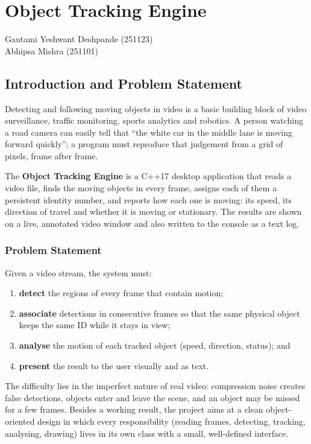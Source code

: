 \documentclass[12pt,a4paper,oneside]{book}
\makeatletter
\newcommand{\chapterauthor}[1]{%
  {\parindent0pt\vspace*{-15pt}%
  \linespread{1.1}\large\itshape\begin{flushright}#1\end{flushright}%
  \par\nobreak\vspace*{25pt}}
  \@afterheading%
}
\makeatother
\begin{document}
\pagestyle{plain}%
\mainmatter


\setcounter{chapter}{2}%
\chapter{Object Tracking Engine}
\chapterauthor{Gautami Yeshwant Deshpande (251123)\\Abhipsa Mishra (251101)}

\section{Introduction and Problem Statement}
Detecting and following moving objects in video is a basic building block of video surveillance, traffic monitoring, sports analytics and robotics. A person watching a road camera can easily tell that ``the white car in the middle lane is moving forward quickly''; a program must reproduce that judgement from a grid of pixels, frame after frame.

The \textbf{Object Tracking Engine} is a C++17 desktop application that reads a video file, finds the moving objects in every frame, assigns each of them a persistent identity number, and reports how each one is moving: its speed, its direction of travel and whether it is moving or stationary. The results are shown on a live, annotated video window and also written to the console as a text log.

\subsection{Problem Statement}
Given a video stream, the system must:
\begin{enumerate}
    \item \textbf{detect} the regions of every frame that contain motion;
    \item \textbf{associate} detections in consecutive frames so that the same physical object keeps the same ID while it stays in view;
    \item \textbf{analyse} the motion of each tracked object (speed, direction, status); and
    \item \textbf{present} the result to the user visually and as text.
\end{enumerate}
The difficulty lies in the imperfect nature of real video: compression noise creates false detections, objects enter and leave the scene, and an object may be missed for a few frames. Besides a working result, the project aims at a clean object-oriented design in which every responsibility (reading frames, detecting, tracking, analysing, drawing) lives in its own class with a small, well-defined interface.
\end{document}
